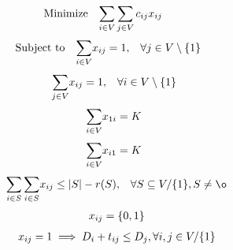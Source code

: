 \begin{equation}
    \begin{array}{ll@{}ll}
        \text{Minimize} & \displaystyle\sum\limits_{i \in V}\sum\limits_{j \in V} c_{ij}&x_{ij} &\\
    \end{array}
\end{equation}
\begin{equation}
    \begin{array}{ll@{}ll}
        \text{Subject to}&\displaystyle\sum\limits_{i \in V}   &x_{ij} = 1,  &\forall j \in V \setminus \{1\}\\
    \end{array}
\end{equation}
\begin{equation}
    \begin{array}{ll@{}ll}
        & \displaystyle\sum\limits_{j \in V}   &x_{ij} = 1,  &\forall i \in V \setminus \{1\}\\
    \end{array}
\end{equation}
\begin{equation}
    \begin{array}{ll@{}ll}
        & \displaystyle\sum\limits_{i \in V}   &x_{1i} = K\\
    \end{array}
\end{equation}
\begin{equation}
    \begin{array}{ll@{}ll}
        & \displaystyle\sum\limits_{i \in V}   &x_{i1} = K\\
    \end{array}
\end{equation}
\begin{equation}
    \begin{array}{ll@{}ll@{}ll}
        & \displaystyle\sum\limits_{i \in S}\sum\limits_{i \in S}  &x_{ij} \leq |S| - r(S), &\forall S \subseteq V/ \{1\} , S \neq \o \\
    \end{array}
\end{equation}
\begin{equation}
    \begin{array}{ll@{}ll@{}ll}
        & x_{ij} = \{0,1\}\\
    \end{array}
\end{equation}
\begin{equation}
    \begin{array}{ll@{}ll@{}ll}
        & x_{ij} = 1 \implies D_{i} + t_{ij} \leq D_{j}, \forall i, j \in V / \{1\}
    \end{array}
\end{equation}
